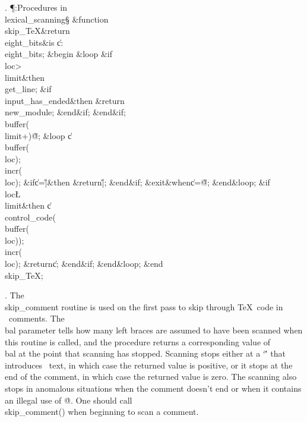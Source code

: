 . \P\?:Procedures in \\{lexical\_scanning}\X\mathrel{+}\S\?\6
\&{function}\8\1\\{skip\_TeX}\?\8\&{return}\?\8\\{eight\_bits}\2\8\&{is}\8%
\1\6
\|c\?:\?\\{eight\_bits};\6
\4\&{begin}\6
\1\&{loop}\6
\&{if}\1\1\8\\{loc}\?>\?\\{limit}\2\8\&{then}\6
\\{get\_line};\6
\&{if}\1\1\8\\{input\_has\_ended}\2\8\&{then}\6
\?\&{return}\?\8\\{new\_module};\2\6
\&{end}\8\2\&{if}\1;\2\6
\&{end}\8\2\&{if}\1;\6
\\{buffer}\?\1(\?\\{limit}\?+\?\2)\K\?\H{@};\6
\1\&{loop}\6
\|c\?\K\?\\{buffer}\?\1(\?\\{loc}\?\2)\?;\5
\\{incr}\?\1(\?\\{loc}\?\2)\?;\6
\&{if}\1\1\8\|c\?=\?\H{|}\2\8\&{then}\6
\?\&{return}\?\8\H{|};\2\6
\&{end}\8\2\&{if}\1;\6
\?\&{exit}\8\&{when}\?\8\|c\?=\?\H{@};\2\6
\&{end}\8\&{loop};\6
\&{if}\1\1\8\\{loc}\?\L\?\\{limit}\2\8\&{then}\6
\|c\?\K\?\\{control\_code}\?\1(\?\\{buffer}\?\1(\?\\{loc}\?\2)\2)\?;\5
\\{incr}\?\1(\?\\{loc}\?\2)\?;\5
\?\&{return}\?\8\|c;\2\6
\&{end}\8\2\&{if}\1;\2\6
\&{end}\8\&{loop};\2\6
\&{end}\8\\{skip\_TeX};\par
\fi

. The \\{skip\_comment} routine is used on the first pass to skip
through \TeX\ code in \ADA\ comments. The \\{bal} parameter
tells how many left braces are assumed to have been scanned when
this routine is called, and the procedure returns a corresponding
value of \\{bal} at the point that scanning has stopped. Scanning
stops either at a `\v' that introduces \ADA\ text,
in which case the returned value is positive, or it stops at the
end of the comment, in which case the returned value is zero.
The scanning also stops in anomalous situations when the comment
doesn't end or when it contains an illegal use of \.{@}.
One should call \\{skip\_comment}\?(\?)\? when beginning to scan a comment.

